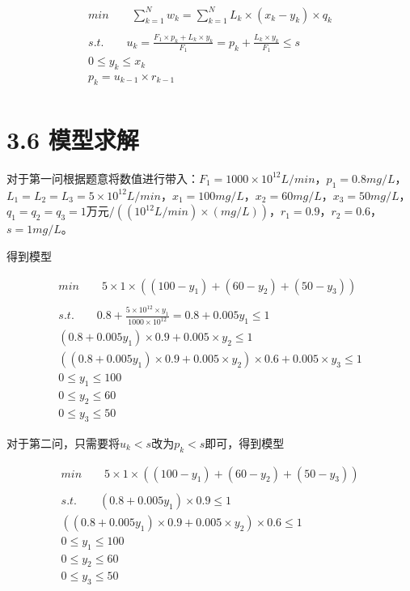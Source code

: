 \documentclass[bachelor,openany,oneside,color]{buaathesis}
\begin{document}
\begin{gather*}min \qquad \sum_{k=1}^Nw_k=\sum_{k=1}^NL_k\times (x_k-y_k)\times q_k\\
\qquad  \\
s.t. \qquad u_k=\frac{F_1\times p_k+L_k\times y_k}{F_1}=p_k+\frac{L_k \times y_k}{F_1} \leq s\\
0\leq y_k\leq x_k\\
p_k=u_{k-1}\times r_{k-1}\\\end{gather*}

\hypertarget{header-n285}{%
\section{3.6 模型求解}\label{header-n285}}

对于第一问根据题意将数值进行带入：\(F_1=1000\times 10^{12}L/min\)，\(p_1=0.8mg/L\)，\(L_1=L_2=L_3=5\times 10^{12}L/min\)，\(x_1=100mg/L\)，\(x_2=60mg/L\)，\(x_3=50mg/L\)，\(q_1=q_2=q_3=1万元/((10^{12}L/min)\times (mg/L))\)，\(r_1=0.9\)，\(r_2=0.6\)，\(s=1mg/L\)。

得到模型

\begin{gather*}min \qquad 5\times 1\times ((100-y_1)+(60-y_2)+(50-y_3))\\
\qquad  \\
s.t.\qquad 0.8+\frac{5\times 10^{12}\times y_1}{1000\times 10^{12}}=0.8+0.005y_1\leq 1\\
(0.8+0.005y_1)\times 0.9+0.005\times y_2\leq 1\\
((0.8+0.005y_1)\times 0.9+0.005\times y_2)\times 0.6+0.005\times y_3\leq 1\\
0\leq y_1 \leq 100\\
0\leq y_2 \leq 60\\
0\leq y_3 \leq 50\end{gather*}

对于第二问，只需要将\(u_k<s\)改为\(p_k<s\)即可，得到模型

\begin{gather*}min \qquad 5\times 1\times ((100-y_1)+(60-y_2)+(50-y_3))\\
\qquad  \\
s.t.\qquad(0.8+0.005y_1)\times 0.9\leq 1\\
((0.8+0.005y_1)\times 0.9+0.005\times y_2)\times 0.6\leq 1\\
0\leq y_1 \leq 100\\
0\leq y_2 \leq 60\\
0\leq y_3 \leq 50\end{gather*}
\end{document}
